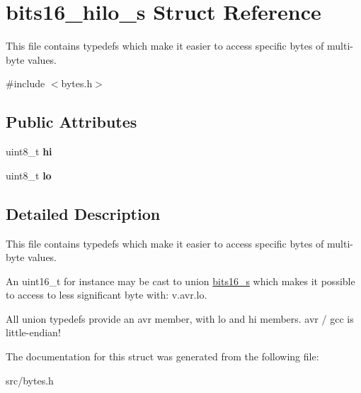 \hypertarget{structbits16__hilo__s}{}\section{bits16\+\_\+hilo\+\_\+s Struct Reference}
\label{structbits16__hilo__s}


This file contains {\ttfamily typedef}s which make it easier to access specific bytes of multi-\/byte values.  




{\ttfamily \#include $<$bytes.\+h$>$}

\subsection*{Public Attributes}
\begin{DoxyCompactItemize}
\item 
uint8\+\_\+t {\bfseries hi}\hypertarget{structbits16__hilo__s_a98071eaa0aa7ced793222f30fa7955e4}{}\label{structbits16__hilo__s_a98071eaa0aa7ced793222f30fa7955e4}

\item 
uint8\+\_\+t {\bfseries lo}\hypertarget{structbits16__hilo__s_ab3f69ba4a390e1db439cf56708ecc799}{}\label{structbits16__hilo__s_ab3f69ba4a390e1db439cf56708ecc799}

\end{DoxyCompactItemize}


\subsection{Detailed Description}
This file contains {\ttfamily typedef}s which make it easier to access specific bytes of multi-\/byte values. 

An {\ttfamily uint16\+\_\+t} for instance may be cast to {\ttfamily union \hyperlink{unionbits16__s}{bits16\+\_\+s}} which makes it possible to access to less significant byte with\+: {\ttfamily v.\+avr.\+lo}.

All {\ttfamily union} {\ttfamily typedef}s provide an {\ttfamily avr} member, with {\ttfamily lo} and {\ttfamily hi} members. {\ttfamily avr} / gcc is little-\/endian! 

The documentation for this struct was generated from the following file\+:\begin{DoxyCompactItemize}
\item 
src/bytes.\+h\end{DoxyCompactItemize}
